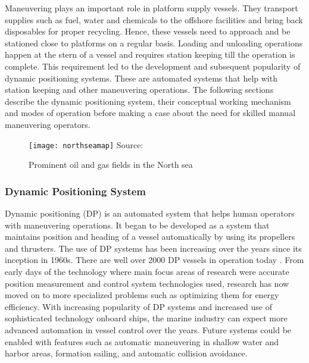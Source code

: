 Maneuvering plays an important role in platform supply vessels. They transport supplies such as fuel, water and chemicals to the offshore facilities and bring back disposables for proper recycling. Hence, these vessels need to approach and be stationed close to platforms on a regular basis. Loading and unloading operations happen at the stern of a vessel and requires station keeping till the operation is complete. This requirement led to the development and subsequent popularity of dynamic positioning systems. These are automated systems that help with station keeping and other maneuvering operations. The following sections describe the dynamic positioning system, their conceptual working mechanism and modes of operation before making a case about the need for skilled manual maneuvering operators.

\begin{figure}
	\centering
	\caption{Prominent oil and gas fields in the North sea}
	\texttt{[image: northseamap]}
	\label{fig:northseamap}
	\hbox{\small Source: }
\end{figure}

\subsubsection{Dynamic Positioning System}

Dynamic positioning (DP) is an automated system that helps human operators with maneuvering operations. It began to be developed as a system that maintains position and heading of a vessel automatically by using its propellers and thrusters. The use of DP systems has been increasing over the years since its inception in 1960s. There are well over 2000 DP vessels in operation today \cite{sorensen2011survey}. From early days of the technology where main focus areas of research were accurate position measurement and control system technologies used, research has now moved on to more specialized problems such as optimizing them for energy efficiency. With increasing popularity of DP systems and increased use of sophisticated technology onboard ships, the marine industry can expect more advanced automation in vessel control over the years. Future systems could be enabled with features such as automatic maneuvering in shallow water and harbor areas, formation sailing, and automatic collision avoidance.

